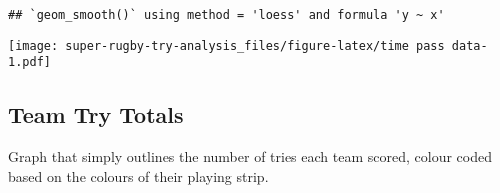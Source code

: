\documentclass[
]{article}
\newenvironment{Shaded}{\begin{snugshade}}{\end{snugshade}}
\newcommand{\DataTypeTok}[1]{\textcolor[rgb]{0.13,0.29,0.53}{#1}}
\newcommand{\DecValTok}[1]{\textcolor[rgb]{0.00,0.00,0.81}{#1}}
\newcommand{\FloatTok}[1]{\textcolor[rgb]{0.00,0.00,0.81}{#1}}
\newcommand{\KeywordTok}[1]{\textcolor[rgb]{0.13,0.29,0.53}{\textbf{#1}}}
\newcommand{\NormalTok}[1]{#1}
\newcommand{\OperatorTok}[1]{\textcolor[rgb]{0.81,0.36,0.00}{\textbf{#1}}}
\newcommand{\StringTok}[1]{\textcolor[rgb]{0.31,0.60,0.02}{#1}}
\begin{document}
\begin{Shaded}
\end{Shaded}

\begin{verbatim}
## `geom_smooth()` using method = 'loess' and formula 'y ~ x'
\end{verbatim}

\texttt{[image: super-rugby-try-analysis\_files/figure-latex/time pass data-1.pdf]}

\hypertarget{team-try-totals}{%
\subsection{\texorpdfstring{\textbf{Team Try
Totals}}{Team Try Totals}}\label{team-try-totals}}

Graph that simply outlines the number of tries each team scored, colour
coded based on the colours of their playing strip.
\end{document}
